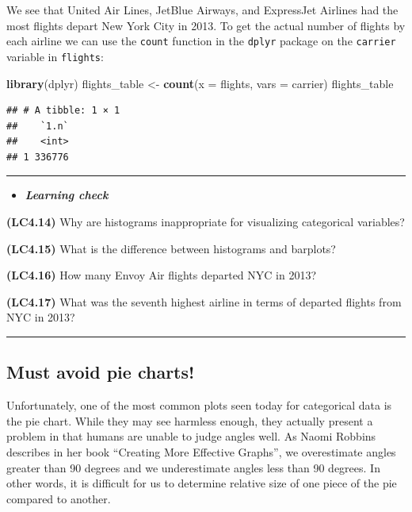 \documentclass[]{tufte-book}
\newenvironment{Shaded}{\begin{snugshade}}{\end{snugshade}}
\newcommand{\KeywordTok}[1]{\textcolor[rgb]{0.13,0.29,0.53}{\textbf{{#1}}}}
\newcommand{\DataTypeTok}[1]{\textcolor[rgb]{0.13,0.29,0.53}{{#1}}}
\newcommand{\StringTok}[1]{\textcolor[rgb]{0.31,0.60,0.02}{{#1}}}
\newcommand{\NormalTok}[1]{{#1}}
\let\oldrule=\rule
\renewcommand{\rule}[1]{\oldrule{\linewidth}}
\newenvironment{rmdblock}[1]
  {\begin{shaded*}
  \begin{itemize}
  \renewcommand{\labelitemi}{
    \raisebox{-.7\height}[0pt][0pt]{
    }
  }
  \item
  }
  {
  \end{itemize}
  \end{shaded*}
  }
\newenvironment{learncheck}
  {\begin{rmdblock}{warning}}
  {\end{rmdblock}}
\begin{document}
We see that United Air Lines, JetBlue Airways, and ExpressJet Airlines
had the most flights depart New York City in 2013. To get the actual
number of flights by each airline we can use the \texttt{count} function
in the \texttt{dplyr} package on the \texttt{carrier} variable in
\texttt{flights}:

\begin{Shaded}
\begin{Highlighting}[]
\KeywordTok{library}\NormalTok{(dplyr)}
\NormalTok{flights_table <-}\StringTok{ }\KeywordTok{count}\NormalTok{(}\DataTypeTok{x =} \NormalTok{flights, }\DataTypeTok{vars =} \NormalTok{carrier)}
\NormalTok{flights_table}
\end{Highlighting}
\end{Shaded}

\begin{verbatim}
## # A tibble: 1 × 1
##    `1.n`
##    <int>
## 1 336776
\end{verbatim}

\begin{center}\rule{0.5\linewidth}{\linethickness}\end{center}

\begin{learncheck}
\textbf{\emph{Learning check}}
\end{learncheck}

\textbf{(LC4.14)} Why are histograms inappropriate for visualizing
categorical variables?

\textbf{(LC4.15)} What is the difference between histograms and
barplots?

\textbf{(LC4.16)} How many Envoy Air flights departed NYC in 2013?

\textbf{(LC4.17)} What was the seventh highest airline in terms of
departed flights from NYC in 2013?

\begin{center}\rule{0.5\linewidth}{\linethickness}\end{center}

\subsection{Must avoid pie charts!}\label{must-avoid-pie-charts}

Unfortunately, one of the most common plots seen today for categorical
data is the pie chart. While they may see harmless enough, they actually
present a problem in that humans are unable to judge angles well. As
Naomi Robbins describes in her book ``Creating More Effective Graphs'',
we overestimate angles greater than 90 degrees and we underestimate
angles less than 90 degrees. In other words, it is difficult for us to
determine relative size of one piece of the pie compared to another.
\end{document}
